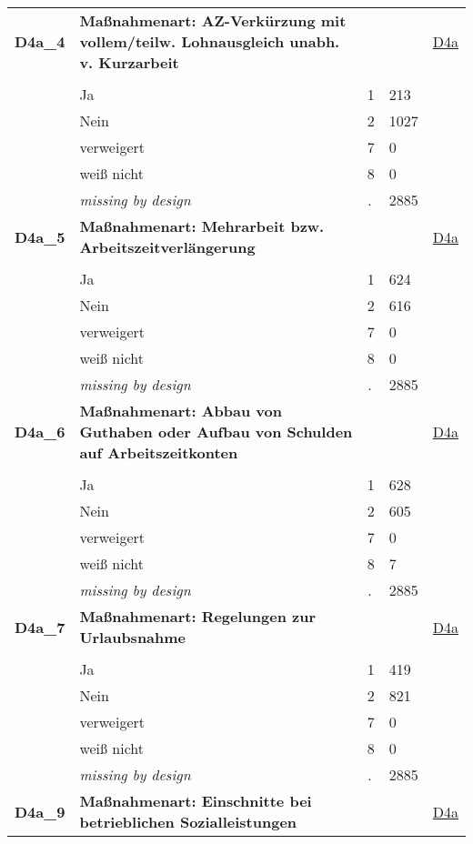 \begin{longtable}{| L{2.65cm} | L{8cm} | C{1.5cm} | R{1.25cm} | C{2.25cm}  |}
   \midrule
\textbf{D4a\_4}\label{var:D4a:4} & \textbf{Maßnahmenart: AZ-Verkürzung mit vollem/teilw. Lohnausgleich unabh. v. Kurzarbeit} &  &  & \hyperref[D4a]{D4a} \\ 
   &  &  &  &  \\ 
   & Ja & 1 & 213 &  \\ 
   & Nein & 2 & 1027 &  \\ 
   & verweigert & 7 & 0 &  \\ 
   & weiß nicht & 8 & 0 &  \\ 
   & \textit{missing by design} & \textit{.} & 2885 &  \\ 
   \midrule
\textbf{D4a\_5}\label{var:D4a:5} & \textbf{Maßnahmenart: Mehrarbeit bzw. Arbeitszeitverlängerung} &  &  & \hyperref[D4a]{D4a} \\ 
   &  &  &  &  \\ 
   & Ja & 1 & 624 &  \\ 
   & Nein & 2 & 616 &  \\ 
   & verweigert & 7 & 0 &  \\ 
   & weiß nicht & 8 & 0 &  \\ 
   & \textit{missing by design} & \textit{.} & 2885 &  \\ 
   \midrule
\textbf{D4a\_6}\label{var:D4a:6} & \textbf{Maßnahmenart: Abbau von Guthaben oder Aufbau von Schulden auf Arbeitszeitkonten} &  &  & \hyperref[D4a]{D4a} \\ 
   &  &  &  &  \\ 
   & Ja & 1 & 628 &  \\ 
   & Nein & 2 & 605 &  \\ 
   & verweigert & 7 & 0 &  \\ 
   & weiß nicht & 8 & 7 &  \\ 
   & \textit{missing by design} & \textit{.} & 2885 &  \\ 
   \midrule
\textbf{D4a\_7}\label{var:D4a:7} & \textbf{Maßnahmenart: Regelungen zur Urlaubsnahme} &  &  & \hyperref[D4a]{D4a} \\ 
   &  &  &  &  \\ 
   & Ja & 1 & 419 &  \\ 
   & Nein & 2 & 821 &  \\ 
   & verweigert & 7 & 0 &  \\ 
   & weiß nicht & 8 & 0 &  \\ 
   & \textit{missing by design} & \textit{.} & 2885 &  \\ 
   \midrule
\textbf{D4a\_9}\label{var:D4a:9} & \textbf{Maßnahmenart: Einschnitte bei betrieblichen Sozialleistungen} &  &  & \hyperref[D4a]{D4a} \\ 

\end{longtable}
